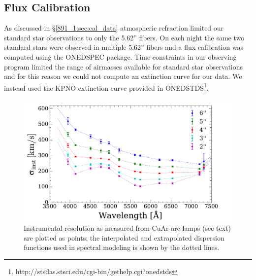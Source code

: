 \subsection{Flux Calibration}
\label{891_1:sec:flux_cal}


As discussed in \S\ref{891_1:sec:cal_data} atmospheric refraction limited
our standard star observations to only the 5.62'' fibers. On each
night the same two standard stars were observed in multiple 5.62''
fibers and a flux calibration was computed using the ONEDSPEC
package. Time constraints in our observing program limited the range
of airmasses available for standard star observations and for this
reason we could not compute an extinction curve for our data. We
instead used the KPNO extinction curve provided in
ONEDSTDS\footnote{http://stsdas.stsci.edu/cgi-bin/gethelp.cgi?onedstds}.

\begin{figure}
  \centering
  \includegraphics[width=\columnwidth]{891_1/figs/disp_paper.pdf}

  \caption[Variation of instrumental resolution in \GP
  fibers]{\label{891_1:fig:dispfunc}\fixspacing Instrumental resolution as
    measured from CuAr arc-lamps (see text) are plotted as points; the
    interpolated and extrapolated dispersion functions used in
    spectral modeling is shown by the dotted lines.}
\end{figure}

